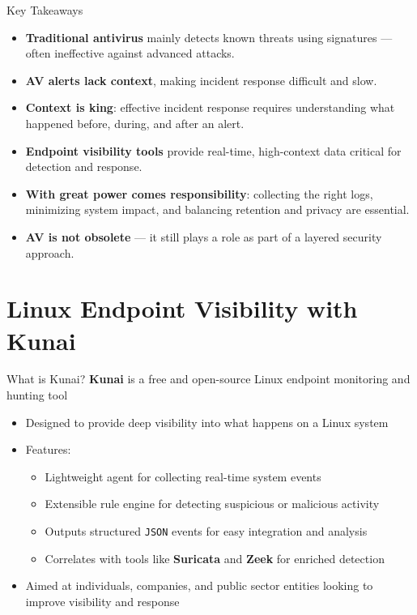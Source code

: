 \documentclass[12pt,aspectratio=169, colorlinks=true, linkcolor=circlBlue]{beamer}
\begin{document}
\begin{frame}{Key Takeaways}
	\begin{itemize}
		\item \textbf{Traditional antivirus} mainly detects known threats using signatures — often ineffective against advanced attacks.
		\item \textbf{AV alerts lack context}, making incident response difficult and slow.
		\item \textbf{Context is king}: effective incident response requires understanding what happened before, during, and after an alert.
		\item \textbf{Endpoint visibility tools} provide real-time, high-context data critical for detection and response.
		\item \textbf{With great power comes responsibility}: collecting the right logs, minimizing system impact, and balancing retention and privacy are essential.
		\item \textbf{AV is not obsolete} — it still plays a role as part of a layered security approach.
	\end{itemize}
\end{frame}


\section{Linux Endpoint Visibility with Kunai}

\begin{frame}{What is Kunai?}
	\textbf{Kunai} is a free and open-source Linux endpoint monitoring and hunting tool
	\begin{itemize}
		\item Designed to provide deep visibility into what happens on a Linux system
		\item Features:
		      \begin{itemize}
			      \item Lightweight agent for collecting real-time system events
			      \item Extensible rule engine for detecting suspicious or malicious activity
			      \item Outputs structured \texttt{JSON} events for easy integration and analysis
			      \item Correlates with tools like \textbf{Suricata} and \textbf{Zeek} for enriched detection
		      \end{itemize}
		\item Aimed at individuals, companies, and public sector entities looking to improve visibility and response
	\end{itemize}
\end{frame}
\end{document}
